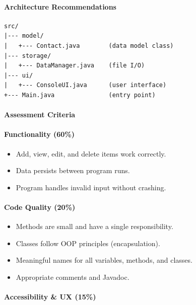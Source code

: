 \documentclass[
  justified,
  openright,
]{tufte-book}
\let\subsection\paragraph
\let\paragraph\paragraph
\let\subsection\paragraph
\let\paragraph\paragraph
\providecommand{\tightlist}{%
  \setlength{\itemsep}{0pt}\setlength{\parskip}{0pt}}
\begin{document}
\subsection{Architecture
Recommendations}\label{architecture-recommendations}

\begin{verbatim}
src/
|--- model/
|   +--- Contact.java        (data model class)
|--- storage/
|   +--- DataManager.java    (file I/O)
|--- ui/
|   +--- ConsoleUI.java      (user interface)
+--- Main.java               (entry point)
\end{verbatim}

\subsection{Assessment Criteria}\label{assessment-criteria-2}

\subsection{Functionality (60\%)}\label{functionality-60-2}

\begin{itemize}
\tightlist
\item[$\square$]
  Add, view, edit, and delete items work correctly.
\item[$\square$]
  Data persists between program runs.
\item[$\square$]
  Program handles invalid input without crashing.
\end{itemize}

\subsection{Code Quality (20\%)}\label{code-quality-20-1}

\begin{itemize}
\tightlist
\item[$\square$]
  Methods are small and have a single responsibility.
\item[$\square$]
  Classes follow OOP principles (encapsulation).
\item[$\square$]
  Meaningful names for all variables, methods, and classes.
\item[$\square$]
  Appropriate comments and Javadoc.
\end{itemize}

\subsection{Accessibility \& UX (15\%)}\label{accessibility-ux-15-1}
\end{document}
